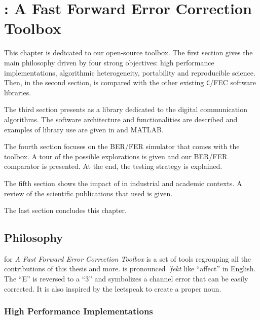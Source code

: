 
\renewcommand{\curChapter}{main/chapter3}

\chapter{\AFFECT: A Fast Forward Error Correction Toolbox}
\label{chap:aff3ct}

This chapter is dedicated to our \AFFECT open-source toolbox. The first section
gives the main philosophy driven by four strong objectives: high performance
implementations, algorithmic heterogeneity, portability and reproducible
science. Then, in the second section, \AFFECT is compared with the other
existing \verb|C|/\Cxx FEC software libraries.

The third section presents \AFFECT as a library dedicated to the digital
communication algorithms. The software architecture and functionalities are
described and examples of library use are given in \Cxx and MATLAB.

The fourth section focuses on the \AFFECT BER/FER simulator that comes with
the toolbox. A tour of the possible explorations is given and our BER/FER
comparator is presented. At the end, the \AFFECT testing strategy is explained.

The fifth section shows the impact of \AFFECT in industrial and academic
contexts. A review of the scientific publications that used \AFFECT is given.

The last section concludes this chapter.

\vspace*{\fill}
\minitoccustom
\vspace*{\fill}

\newpage
\section{Philosophy}

\AFFECT for \emph{A Fast Forward Error Correction Toolbox} is a set of tools
regrouping all the contributions of this thesis and more. \AFFECT is pronounced
\emph{\textschwa'fekt} like ``affect'' in English. The ``E'' is reversed to a
``3'' and symbolizes a channel error that can be easily corrected. It is also
inspired by the leetspeak to create a proper noun.

\subsection{High Performance Implementations}

